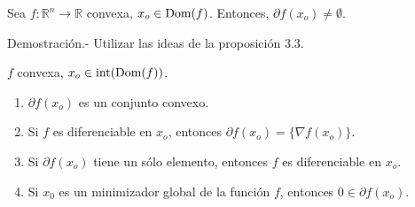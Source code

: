 \begin{paracol}{2}
{\color{blue}
\begin{teo} Sea $f:\mathbb{R}^n\to \mathbb{R}$ convexa, $x_o\in \mathop{\mbox{\normalfont Dom}}\nolimits(f)$. Entonces, $\partial f(x_o)\neq \emptyset$.

    Demostración.-\; Utilizar las ideas de la proposición 3.3.
\end{teo}
}

\begin{prop} $f$ convexa, $x_o\in \mathop{\mbox{\normalfont int}}\nolimits(\mathop{\mbox{\normalfont Dom}}\nolimits(f))$.
    \begin{enumerate}[\bfseries 1.]
	\item $\partial f(x_o)$ es un conjunto convexo.
	\item Si $f$ es diferenciable en $x_o$, entonces $\partial f(x_o)=\{\nabla f(x_o)\}$.
	\item Si $\partial f(x_o)$ tiene un sólo elemento, entonces $f$ es diferenciable en $x_o$.
	\item Si $x_0$ es un minimizador global de la función $f$, entonces $0\in \partial f(x_o)$.
    \end{enumerate}
\end{prop}

\end{paracol}
